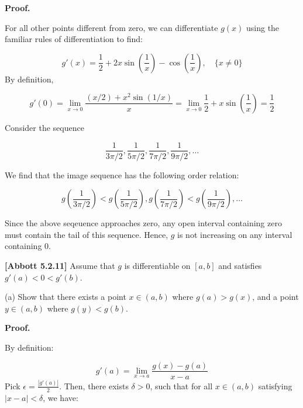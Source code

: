 \documentclass[10pt]{article}
\begin{document}
\textbf{Proof.}



For all other points different from zero, we can differentiate $\displaystyle g( x)$ using the familiar rules of differentiation to find:


\begin{equation*}
g'( x) =\frac{1}{2} +2x\sin\left(\frac{1}{x}\right) -\cos\left(\frac{1}{x}\right) ,\quad \{x\neq 0\}
\end{equation*}
By definition,


\begin{equation*}
g'( 0) =\lim _{x\rightarrow 0}\frac{( x/2) +x^{2}\sin( 1/x)}{x} =\lim _{x\rightarrow 0}\frac{1}{2} +x\sin\left(\frac{1}{x}\right) =\frac{1}{2}
\end{equation*}


Consider the sequence 


\begin{equation*}
\frac{1}{3\pi /2} ,\frac{1}{5\pi /2} ,\frac{1}{7\pi /2} ,\frac{1}{9\pi /2} ,\dotsc 
\end{equation*}


We find that the image sequence has the following order relation:


\begin{equation*}
g\left(\frac{1}{3\pi /2}\right) < g\left(\frac{1}{5\pi /2}\right) ,g\left(\frac{1}{7\pi /2}\right) < g\left(\frac{1}{9\pi /2}\right) ,\dotsc 
\end{equation*}


Since the above seqeuence approaches zero, any open interval containing zero must contain the tail of this sequence. Hence, $\displaystyle g$ is not increasing on any interval containing $\displaystyle 0$.



\textbf{[Abbott 5.2.11]} Assume that $\displaystyle g$ is differentiable on $\displaystyle [ a,b]$ and satisfies $\displaystyle g'( a) < 0< g'( b)$.



(a) Show that there exists a point $\displaystyle x\in ( a,b)$ where $\displaystyle g( a)  >g( x)$, and a point $\displaystyle y\in ( a,b)$ where $\displaystyle g( y) < g( b)$.



\textbf{Proof.}



By definition:


\begin{equation*}
g'( a) =\lim _{x\rightarrow a}\frac{g( x) -g( a)}{x-a}
\end{equation*}
Pick $\displaystyle \epsilon =\frac{|g'( a) |}{2}$. Then, there exists $\displaystyle \delta  >0$, such that for all $\displaystyle x\in ( a,b)$ satisfying $\displaystyle |x-a|< \delta $, we have:
\end{document}
